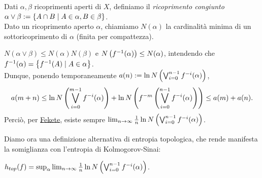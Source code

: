\begin{defi}Dati $\alpha,\beta$ ricoprimenti aperti di $X$, definiamo il \emph{ricoprimento congiunto}
$\alpha\vee\beta:=\left\{A\cap B\mid A\in\alpha,B\in\beta\right\}$. \\
Dato un ricoprimento aperto $\alpha$, chiamiamo $N(\alpha)$ la cardinalità minima di un sottoricoprimento di $\alpha$
(finita per compattezza).
\end{defi}

\begin{oss}$N(\alpha\vee\beta)\le N(\alpha)N(\beta)$ e $N\left(f^{-1}(\alpha)\right)\le N(\alpha)$,
intendendo che $f^{-1}(\alpha)=\left\{f^{-1}(A)\mid A\in\alpha\right\}$. \\
Dunque, ponendo temporaneamente $a(n):=\ln N\left(\bigvee_{i=0}^{n-1}f^{-i}(\alpha)\right)$,
\[ a(m+n)\le\ln N\left(\bigvee_{i=0}^{m-1}f^{-i}(\alpha)\right)+\ln N\left(f^{-m}\left(\bigvee_{i=0}^{n-1}f^{-i}(\alpha)\right)\right)
\le a(m)+a(n). \]
Perciò, per \hyperref[fekete]{Fekete}, esiste sempre $\lim_{n\to\infty}\frac{1}{n}\ln N\left(\bigvee_{i=0}^{n-1}f^{-i}(\alpha)\right)$.
\end{oss}

Diamo ora una definizione alternativa di entropia topologica, che rende manifesta la somiglianza con l'entropia
di Kolmogorov-Sinai:

\begin{teo}$h_{top}(f)=\sup_\alpha\lim_{n\to\infty}\frac{1}{n}\ln N\left(\bigvee_{i=0}^{n-1}f^{-i}(\alpha)\right)$.
\end{teo}

